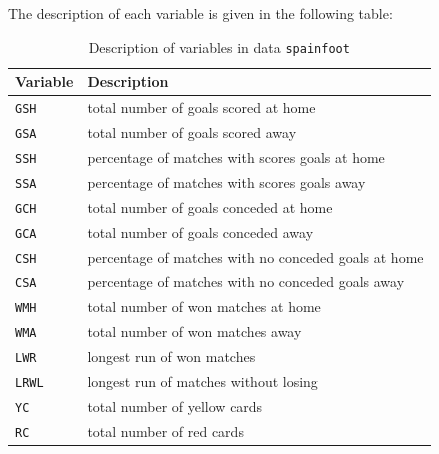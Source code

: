 \documentclass[12pt]{book}\usepackage{graphicx, color}
\newcommand{\code}[1]{\texttt{#1}}
\begin{document}
The description of each variable is given in the following table:

\begin{table}[h]
 \caption{Description of variables in data \code{spainfoot}} 
 \centering
 \begin{tabular}{l l}
  \hline
  Variable & Description \\
  \hline
  \code{GSH} & total number of goals scored at home  \\
  \code{GSA} & total number of goals scored away \\
  \code{SSH} & percentage of matches with scores goals at home \\
  \code{SSA} & percentage of matches with scores goals away \\
  \code{GCH} & total number of goals conceded at home \\
  \code{GCA} & total number of goals conceded away \\
  \code{CSH} & percentage of matches with no conceded goals at home \\
  \code{CSA} & percentage of matches with no conceded goals away \\
  \code{WMH} & total number of won matches at home \\
  \code{WMA} & total number of won matches away \\
  \code{LWR} & longest run of won matches \\
  \code{LRWL} &longest run of matches without losing \\
  \code{YC} & total number of yellow cards \\
  \code{RC} & total number of red cards \\
  \hline
 \end{tabular}
 \label{tab:spainfoot}
\end{table}
\end{document}
